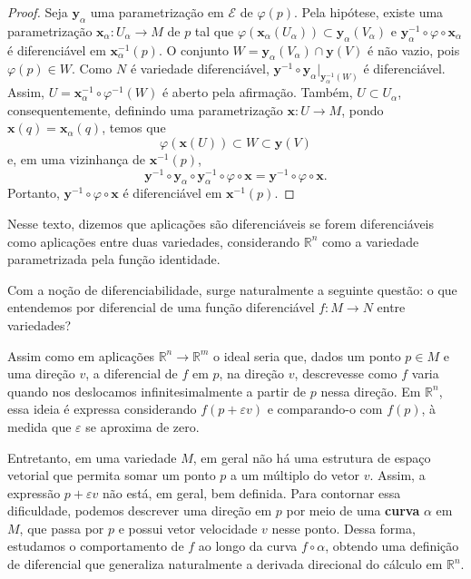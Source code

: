 \begin{proposition}
\begin{proof}
			Seja $\mathbf{y}_{\alpha}$ uma parametrização em $\mathcal{E}$ de $\varphi(p)$. Pela hipótese, existe uma parametrização $\mathbf{x}_{\alpha}:U_{\alpha}\to M$ de $p$ tal que $\varphi(\mathbf{x}_{\alpha}(U_{\alpha}))\subset \mathbf{y}_{\alpha}(V_{\alpha})$ e $\mathbf{y}_{\alpha}^{-1} \circ \varphi \circ \mathbf{x}_{\alpha}$ é diferenciável em $\mathbf{x}_{\alpha}^{-1}(p)$.
			O conjunto $W=\mathbf{y}_{\alpha}(V_{\alpha})\cap \mathbf{y}(V)$ é não vazio, pois $\varphi(p)\in W$. Como $N$ é variedade diferenciável, $\mathbf{y}^{-1} \circ \mathbf{y}_{\alpha}|_{\mathbf{y}_{\alpha}^{-1}(W)}$ é diferenciável.
			Assim, $U=\mathbf{x}_{\alpha}^{-1} \circ \varphi ^{-1}(W)$ é aberto pela afirmação.
			Também, $U \subset U_{\alpha}$, consequentemente, definindo uma parametrização $\mathbf{x}:U\to M$, pondo $\mathbf{x}(q)=\mathbf{x}_{\alpha}(q)$, temos que
			\begin{equation*}
				\varphi(\mathbf{x}(U))\subset W\subset \mathbf{y}(V)
			\end{equation*}
			e, em uma vizinhança de $\mathbf{x}^{-1}(p)$,
			\begin{equation*}
				\mathbf{y}^{-1} \circ \mathbf{y}_{\alpha} \circ  \mathbf{y}_{\alpha}^{-1} \circ  \varphi \circ  \mathbf{x} =\mathbf{y}^{-1} \circ  \varphi \circ  \mathbf{x}.
			\end{equation*}
			Portanto, $\mathbf{y}^{-1} \circ \varphi \circ \mathbf{x}$ é diferenciável em $\mathbf{x}^{-1}(p)$.
		\end{proof}
	\end{proposition}

	Nesse texto, dizemos que aplicações são diferenciáveis se forem diferenciáveis como aplicações entre duas variedades, considerando $\mathbb{R}^{n}$ como a variedade parametrizada pela função identidade.

	Com a noção de diferenciabilidade, surge naturalmente a seguinte questão: o que entendemos por diferencial de uma função diferenciável $f:M\to N$ entre variedades?

	Assim como em aplicações $\mathbb{R}^n \to \mathbb{R}^m$ o ideal seria que, dados um ponto $p\in M$ e uma direção $v$, a diferencial de $f$ em $p$, na direção $v$, descrevesse como $f$ varia quando nos deslocamos infinitesimalmente a partir de $p$ nessa direção. Em $\mathbb{R}^n$, essa ideia é expressa considerando $f(p+\varepsilon v)$ e comparando-o com $f(p)$, à medida que $\varepsilon$ se aproxima de zero.

	Entretanto, em uma variedade $M$, em geral não há uma estrutura de espaço vetorial que permita somar um ponto $p$ a um múltiplo do vetor $v$. Assim, a expressão $p+\varepsilon v$ não está, em geral, bem definida. Para contornar essa dificuldade, podemos descrever uma direção em $p$ por meio de uma \textbf{curva} $\alpha$ em $M$, que passa por $p$ e possui vetor velocidade $v$ nesse ponto. Dessa forma, estudamos o comportamento de $f$ ao longo da curva $f\circ\alpha$, obtendo uma definição de diferencial que generaliza naturalmente a derivada direcional do cálculo em $\mathbb{R}^n$.

